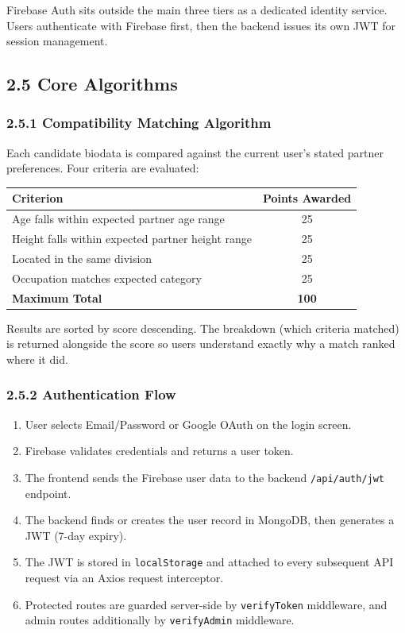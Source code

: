 \documentclass[conference]{IEEEtran}
\begin{document}
Firebase Auth sits outside the main three tiers as a dedicated identity service. Users authenticate with Firebase first, then the backend issues its own JWT for session management.

\subsection*{2.5 Core Algorithms}

\subsubsection*{2.5.1 Compatibility Matching Algorithm}
Each candidate biodata is compared against the current user's stated partner preferences. Four criteria are evaluated:

\begin{table}[htbp]
\centering
\footnotesize
\renewcommand{\arraystretch}{1.3}
\begin{tabularx}{\columnwidth}{|X|c|}
\hline
\textbf{Criterion} & \textbf{Points Awarded} \\ \hline
Age falls within expected partner age range & 25 \\ \hline
Height falls within expected partner height range & 25 \\ \hline
Located in the same division & 25 \\ \hline
Occupation matches expected category & 25 \\ \hline
\textbf{Maximum Total} & \textbf{100} \\ \hline
\end{tabularx}
\end{table}

Results are sorted by score descending. The breakdown (which criteria matched) is returned alongside the score so users understand exactly why a match ranked where it did.

\subsubsection*{2.5.2 Authentication Flow}
\begin{enumerate}
    \item User selects Email/Password or Google OAuth on the login screen.
    \item Firebase validates credentials and returns a user token.
    \item The frontend sends the Firebase user data to the backend \texttt{/api/auth/jwt} endpoint.
    \item The backend finds or creates the user record in MongoDB, then generates a JWT (7-day expiry).
    \item The JWT is stored in \texttt{localStorage} and attached to every subsequent API request via an Axios request interceptor.
    \item Protected routes are guarded server-side by \texttt{verifyToken} middleware, and admin routes additionally by \texttt{verifyAdmin} middleware.
\end{enumerate}
\end{document}
